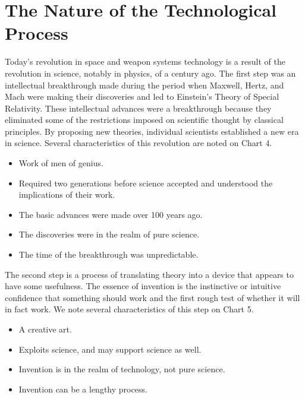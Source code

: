 \chapter{The Nature of the Technological Process}

Today's revolution in space and weapon systems technology is a result of the revolution in science, notably in physics, of a century ago. The first step was an intellectual breakthrough made during the period when Maxwell, Hertz, and Mach were making their discoveries and led to Einstein's Theory of Special Relativity. These intellectual advances were a breakthrough because they eliminated some of the restrictions imposed on scientific thought by classical principles. By proposing new theories, individual scientists established a new era in science. Several characteristics of this revolution are noted on Chart 4.

\medskip

\begin{mdframed}[nobreak=true, backgroundcolor=ApricotWhite, frametitle={CHART 4: The Intellectual Breakthrough}]
    \begin{itemize}
        \item Work of men of genius.
        \item Required two generations before science accepted and understood the implications of their work.
        \item The basic advances were made over 100 years ago.
        \item The discoveries were in the realm of pure science.
        \item The time of the breakthrough was unpredictable.
    \end{itemize}
\end{mdframed}

\medskip

The second step is a process of translating theory into a device that appears to have some usefulness. The essence of invention is the instinctive or intuitive confidence that something should work and the first rough test of whether it will in fact work. We note several characteristics of this step on Chart 5.

\begin{mdframed}[nobreak=true, backgroundcolor=ApricotWhite, frametitle={CHART 5: Characteristics of Invention}] 
    \begin{itemize}
        \item A creative art.
        \item Exploits science, and may support science as well.
        \item Invention is in the realm of technology, not pure science.
        \item Invention can be a lengthy process.
    \end{itemize}
\end{mdframed}

